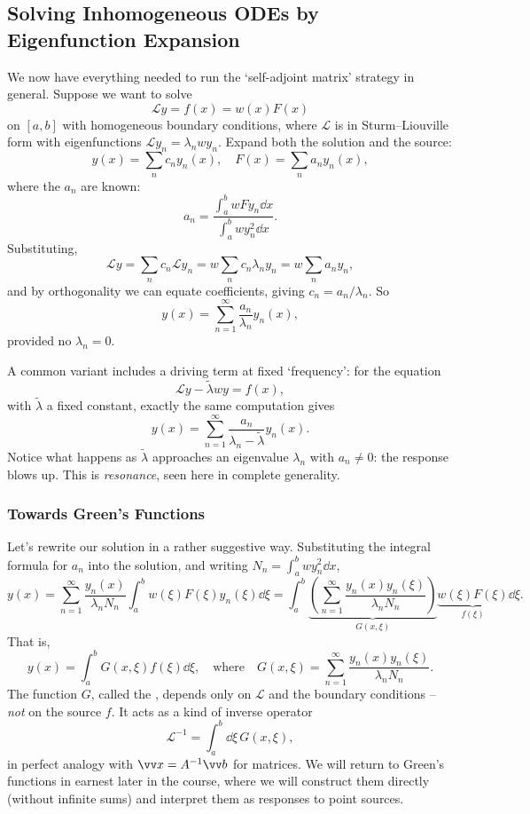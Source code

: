 \subsection{Solving Inhomogeneous ODEs by Eigenfunction Expansion}

We now have everything needed to run the `self-adjoint matrix' strategy in general. Suppose we want to solve
$$
\mathcal{L} y = f(x) = w(x) F(x)
$$
on $[a, b]$ with homogeneous boundary conditions, where $\mathcal{L}$ is in Sturm--Liouville form with eigenfunctions $\mathcal{L} y_n = \lambda_n w y_n$. Expand both the solution and the source:
$$
y(x) = \sum_n c_n y_n(x), \quad F(x) = \sum_n a_n y_n(x),
$$
where the $a_n$ are known:
$$
a_n = \frac{\int_a^b w F y_n \dd x}{\int_a^b w y_n^2 \dd x}.
$$
Substituting,
$$
\mathcal{L} y = \sum_n c_n \mathcal{L} y_n = w \sum_n c_n \lambda_n y_n = w \sum_n a_n y_n,
$$
and by orthogonality we can equate coefficients, giving $c_n = a_n / \lambda_n$. So
$$
y(x) = \sum_{n = 1}^{\infty} \frac{a_n}{\lambda_n} y_n(x),
$$
provided no $\lambda_n = 0$.

A common variant includes a driving term at fixed `frequency': for the equation
$$
\mathcal{L}y - \tilde{\lambda} w y = f(x),
$$
with $\tilde{\lambda}$ a fixed constant, exactly the same computation gives
$$
y(x) = \sum_{n = 1}^{\infty} \frac{a_n}{\lambda_n - \tilde{\lambda}} y_n(x).
$$
Notice what happens as $\tilde{\lambda}$ approaches an eigenvalue $\lambda_n$ with $a_n \neq 0$: the response blows up. This is \emph{resonance}, seen here in complete generality.

\subsubsection*{Towards Green's Functions}

Let's rewrite our solution in a rather suggestive way. Substituting the integral formula for $a_n$ into the solution, and writing $N_n = \int_a^b w y_n^2 \dd x$,
$$
y(x) = \sum_{n = 1}^{\infty} \frac{y_n(x)}{\lambda_n N_n} \int_a^b w(\xi) F(\xi) y_n(\xi) \dd \xi
= \int_a^b \underbrace{\left(\sum_{n = 1}^{\infty} \frac{y_n(x) y_n(\xi)}{\lambda_n N_n}\right)}_{G(x, \xi)} \underbrace{w(\xi) F(\xi)}_{f(\xi)} \dd \xi.
$$
That is,
$$
y(x) = \int_a^b G(x, \xi) f(\xi) \dd \xi, \quad \text{where} \quad G(x, \xi) = \sum_{n = 1}^{\infty} \frac{y_n(x) y_n(\xi)}{\lambda_n N_n}.
$$
The function $G$, called the , depends only on $\mathcal{L}$ and the boundary conditions -- \emph{not} on the source $f$. It acts as a kind of inverse operator
$$
\mathcal{L}^{-1} = \int_a^b \dd \xi \, G(x, \xi),
$$
in perfect analogy with $\vv x = A^{-1} \vv b$ for matrices. We will return to Green's functions in earnest later in the course, where we will construct them directly (without infinite sums) and interpret them as responses to point sources.

